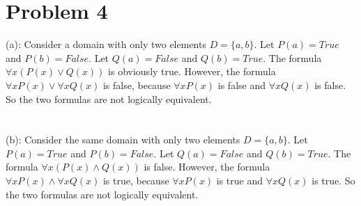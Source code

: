 \documentclass{article}
\begin{document}
\section{Problem 4}
(a): Consider a domain with only two elements $D = \{a,b\}$. Let $P(a) = True$ and $P(b) = False$. Let $Q(a) = False$ and $Q(b) = True$. The formula $\forall x (P(x) \vee Q(x))$ is obviously true. However, the formula $\forall x P(x) \vee \forall x Q(x)$ is false, because $\forall x P(x)$ is false and $\forall x Q(x)$ is false. So the two formulas are not logically equivalent.\\
\\ \hspace*{\fill} \\
(b): Consider the same domain with only two elements $D = \{a,b\}$. Let $P(a) = True$ and $P(b) = False$. Let $Q(a) = False$ and $Q(b) = True$. The formula $\forall x (P(x) \wedge Q(x))$ is false. However, the formula $\forall x P(x) \wedge \forall x Q(x)$ is true, because $\forall x P(x)$ is true and $\forall x Q(x)$ is true. So the two formulas are not logically equivalent.\\
\\ \hspace*{\fill} \\
\end{document}
